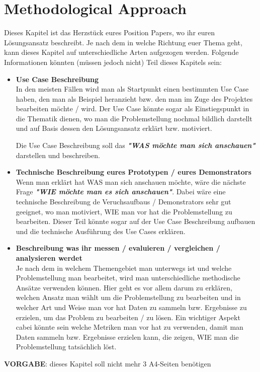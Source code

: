 

\section{Methodological Approach}

Dieses Kapitel ist das Herzstück eures Position Papers, wo ihr euren Lösungsansatz beschreibt. Je nach dem in welche Richtung euer Thema geht, kann dieses Kapitel auf unterschiedliche Arten aufgezogen werden. Folgende Informationen könnten (müssen jedoch nicht) Teil dieses Kapitels sein:
\begin{itemize}
	\item\textbf{Use Case Beschreibung}\\
	In den meisten Fällen wird man als Startpunkt einen bestimmten Use Case haben, den man als Beispiel heranzieht bzw. den man im Zuge des Projektes bearbeiten möchte / wird. Der Use Case könnte sogar als Einstiegspunkt in die Thematik dienen, wo man die Problemstellung nochmal bildlich darstellt und auf Basis dessen den Lösungsansatz erklärt bzw. motiviert.
	
	Die Use Case Beschreibung soll das \textit{\textbf{"WAS möchte man sich anschauen"}} darstellen und beschreiben.\\
		
	\item\textbf{Technische Beschreibung eures Prototypen / eures Demonstrators}\\
	Wenn man erklärt hat WAS man sich anschauen möchte, wäre die nächste Frage \textit{\textbf{"WIE möchte man es sich anschauen"}}. Dabei wäre eine technische Beschreibung de Veruchsaufbaus / Demonstrators sehr gut geeignet, wo man motiviert, WIE man vor hat die Problemstellung zu bearbeiten. Dieser Teil könnte sogar auf der Use Case Beschreibung aufbauen und die technische Ausführung des Use Cases erklären. 
	
	\item\textbf{Beschreibung was ihr messen / evaluieren / vergleichen / analysieren werdet}\\
	Je nach dem in welchem Themengebiet man unterwegs ist und welche Problemstellung man bearbeitet, wird man unterschiedliche methodische Ansätze verwenden können. Hier geht es vor allem darum zu erklären, welchen Ansatz man wählt um die Problemstellung zu bearbeiten und in welcher Art und Weise man vor hat Daten zu sammeln bzw. Ergebnisse zu erzielen, um das Problem zu bearbeiten / zu lösen. Ein wichtiger Aspekt cabei könnte sein welche Metriken man vor hat zu verwenden, damit man Daten sammeln bzw. Ergebnisse erzielen kann, die zeigen, WIE man die Problemstellung tatsächlich löst.
\end{itemize}

\textbf{VORGABE}: dieses Kapitel soll nicht mehr 3 A4-Seiten benötigen

